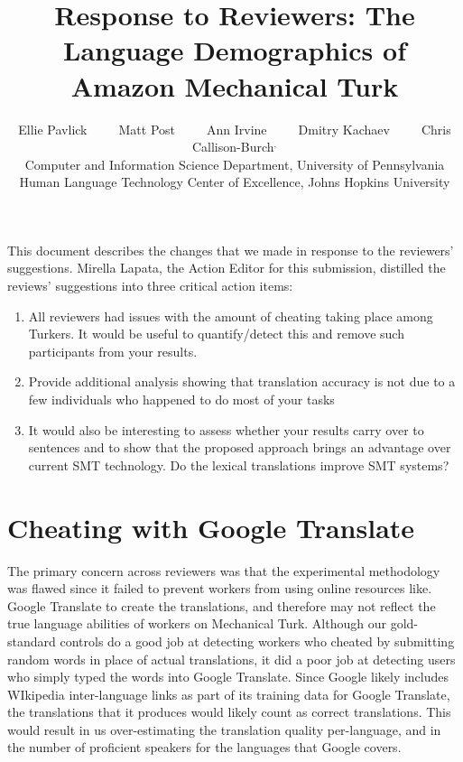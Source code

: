 \documentclass[11pt]{article}
\title{Response  to Reviewers: The Language Demographics of  Amazon Mechanical Turk}
\author{Ellie Pavlick\affliationPenn \ \ \ \ \ Matt Post\affliationJHU \ \ \ \ \ Ann Irvine\affliationJHU  \ \ \ \ \ Dmitry Kachaev\affliationJHU  \ \ \ \ \  Chris Callison-Burch\affliationPenn$^{,}$\affliationJHU \\
\affliationPenn Computer and Information Science Department, University of Pennsylvania \\
\affliationJHU Human Language Technology Center of Excellence, Johns Hopkins University \\
  }
\author{}
\date{}
\begin{document}
\maketitle

This document describes the changes that we made in response to the reviewers' suggestions.  Mirella Lapata, the Action Editor for this submission, distilled the reviews' suggestions into three critical action items:
\begin{enumerate}
\item All reviewers had issues with the amount of cheating taking place among
Turkers. It would be useful to quantify/detect this and remove such
participants from your results. 
\item Provide additional analysis showing that translation accuracy is not due
to a few individuals who happened to do most of your tasks
\item  It would also be interesting to assess
whether your results carry over to sentences and to show that the proposed approach brings an
advantage over current SMT technology.  Do the lexical translations improve
 SMT systems? 
\end{enumerate}

\section{Cheating with Google Translate}

The primary concern across reviewers was that the experimental methodology was flawed since it failed to prevent workers from using online resources like. Google Translate to create the translations, and therefore may not reflect the true language abilities of workers on Mechanical Turk.  
Although our gold-standard controls do a good job at detecting workers who cheated by submitting random words in place of actual translations, it did a poor job at detecting users who simply typed the words into Google Translate.  Since Google likely includes WIkipedia inter-language links as part of its training data for Google Translate, the translations that it produces would likely count as correct translations.  This would result in us over-estimating the translation quality per-language, and in the number of proficient speakers for the languages that Google covers.
\end{document}
